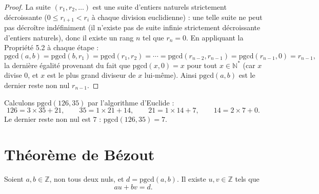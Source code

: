 \documentclass[a4paper,12pt,openany]{book}
\begin{document}
\begin{proof}
La suite $(r_1,r_2,\dots)$ est une suite d'entiers naturels strictement
décroissante ($0\leq r_{i+1}<r_i$ à chaque division euclidienne) : une
telle suite ne peut pas décroître indéfiniment (il n'existe pas de suite
infinie strictement décroissante d'entiers naturels), donc il existe un
rang $n$ tel que $r_n=0$. En appliquant la Propriété 5.2 à chaque étape :
\[
\mathrm{pgcd}(a,b) = \mathrm{pgcd}(b,r_1) = \mathrm{pgcd}(r_1,r_2) = \cdots
= \mathrm{pgcd}(r_{n-2},r_{n-1}) = \mathrm{pgcd}(r_{n-1},0) = r_{n-1},
\]
la dernière égalité provenant du fait que $\mathrm{pgcd}(x,0)=x$ pour tout
$x\in\mathbb{N}^*$ (car $x$ divise $0$, et $x$ est le plus grand diviseur
de $x$ lui-même). Ainsi $\mathrm{pgcd}(a,b)$ est le dernier reste non nul
$r_{n-1}$.
\end{proof}

\begin{exemple}[5.2]
Calculons $\mathrm{pgcd}(126,35)$ par l'algorithme d'Euclide :
\[
126 = 3\times35+21, \qquad 35=1\times21+14, \qquad 21=1\times14+7, \qquad
14=2\times7+0.
\]
Le dernier reste non nul est $7$ : $\mathrm{pgcd}(126,35)=7$.
\end{exemple}

\section{Théorème de Bézout}


\begin{theoreme}
Soient $a,b\in\mathbb{Z}$, non tous deux nuls, et $d=\mathrm{pgcd}(a,b)$.
Il existe $u,v\in\mathbb{Z}$ tels que
\[
au+bv = d.
\]
\end{theoreme}
\end{document}

